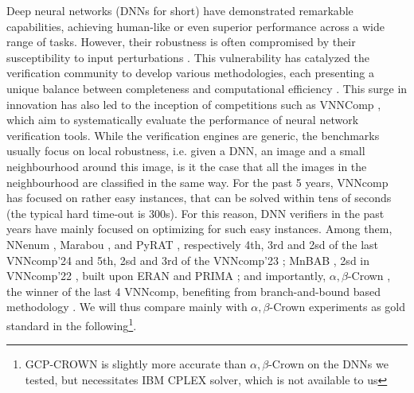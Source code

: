 

Deep neural networks (DNNs for short) have demonstrated remarkable capabilities, achieving human-like or even superior performance across a wide range of tasks. However, their robustness is often compromised by their susceptibility to input perturbations \cite{szegedy}. This vulnerability has catalyzed the verification community to develop various methodologies, each presenting a unique balance between completeness and computational efficiency \cite{Marabou,Reluplex,deeppoly}. This surge in innovation has also led to the inception of competitions such as VNNComp \cite{VNNcomp}, which aim to systematically evaluate the performance of neural network verification tools. While the verification engines are generic, the benchmarks usually focus on local robustness, i.e. given a DNN, an image and a small neighbourhood around this image, is it the case that all the images in the neighbourhood are classified in the same way. 
For the past 5 years, VNNcomp has focused on rather easy instances, that can be solved within tens of seconds (the typical hard time-out is 300s). For this reason, DNN verifiers in the past years have mainly focused on optimizing for such easy instances. Among them, NNenum \cite{nnenum}, Marabou \cite{Marabou,Marabou2}, and PyRAT 
\cite{pyrat}, respectively 4th, 3rd and 2sd of the last VNNcomp'24 \cite{VNNcomp24}
and 5th, 2sd and 3rd  of the VNNcomp'23 \cite{VNNcomp23}; MnBAB \cite{ferrari2022complete}, 2sd in VNNcomp'22 \cite{VNNcomp22}, built upon ERAN \cite{deeppoly} and PRIMA \cite{prima}; and importantly, $\alpha,\beta$-Crown \cite{crown,xu2020fast}, the winner of the last 4 VNNcomp, benefiting from branch-and-bound based methodology \cite{cutting,BaB}.
We will thus compare mainly with $\alpha,\beta$-Crown experiments as gold standard in the following\footnote{GCP-CROWN \cite{cutting} is slightly more accurate than $\alpha,\beta$-Crown on the DNNs we tested, but necessitates IBM CPLEX solver, which is not available to us}.

